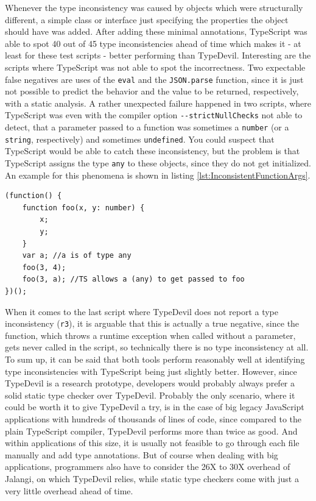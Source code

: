 \documentclass[runningheads,a4paper]{llncs}
\begin{document}
Whenever the type inconsistency was caused by objects which were structurally different, a simple class or interface just specifying the properties the object should have was added.
After adding these minimal annotations, TypeScript was able to spot 40 out of 45 type inconsistencies ahead of time which makes it - at least for these test scripts - better performing than TypeDevil.
Interesting are the scripts where TypeScript was not able to spot the incorrectness.
Two expectable false negatives are uses of the \lstinline[columns=fixed]{eval} and the \lstinline[columns=fixed]{JSON.parse} function, since it is just not possible to predict the behavior and the value to be returned, respectively, with a static analysis.
A rather unexpected failure happened in two scripts, where TypeScript was even with the compiler option \lstinline[columns=fixed]{--strictNullChecks} not able to detect, that a parameter passed to a function was sometimes a \lstinline[columns=fixed]{number} (or a \lstinline[columns=fixed]{string}, respectively) and sometimes \lstinline[columns=fixed]{undefined}.
You could suspect that TypeScript would be able to catch these inconsistency, but the problem is that TypeScript assigns the type \lstinline[columns=fixed]{any} to these objects, since they do not get initialized.
An example for this phenomena is shown in listing \ref{lst:InconsistentFunctionArgs}.

\medskip\medskip
\lstset{language=javascript}
\begin{minipage}{\linewidth}
\begin{lstlisting}[frame=single, caption=Inconsistent Function Args , label={lst:InconsistentFunctionArgs}]
(function() {
    function foo(x, y: number) {
        x;
        y;
    } 
    var a; //a is of type any
    foo(3, 4);
    foo(3, a); //TS allows a (any) to get passed to foo
})();
\end{lstlisting}
\end{minipage}
When it comes to the last script where TypeDevil does not report a type inconsistency (\lstinline[columns=fixed]{r3}), it is arguable that this is actually a true negative, since the function, which throws a runtime exception when called without a parameter, gets never called in the script, so technically there is no type inconsistency at all.\\
To sum up, it can be said that both tools perform reasonably well at identifying type inconsistencies with TypeScript being just slightly better.
However, since TypeDevil is a research prototype, developers would probably always prefer a solid static type checker over TypeDevil.
Probably the only scenario, where it could be worth it to give TypeDevil a try, is in the case of big legacy JavaScript applications with hundreds of thousands of lines of code, since compared to the plain TypeScript compiler, TypeDevil performs more than twice as good.
And within applications of this size, it is usually not feasible to go through each file manually and add type annotations. 
But of course when dealing with big applications, programmers also have to consider the 26X to 30X overhead of Jalangi, on which TypeDevil relies, while static type checkers come with just a very little overhead ahead of time.
\end{document}
